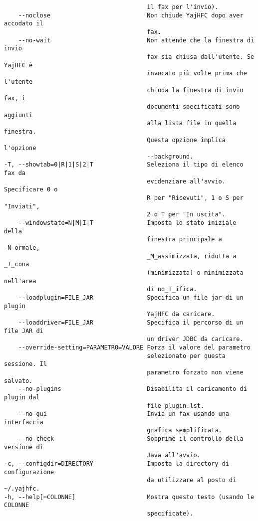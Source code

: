 \documentclass[a4paper,10pt]{scrartcl}
\begin{document}
\begin{verbatim}
                                        il fax per l'invio).
    --noclose                           Non chiude YajHFC dopo aver accodato il
                                        fax.
    --no-wait                           Non attende che la finestra di invio
                                        fax sia chiusa dall'utente. Se YajHFC è
                                        invocato più volte prima che l'utente
                                        chiuda la finestra di invio fax, i
                                        documenti specificati sono aggiunti
                                        alla lista file in quella finestra.
                                        Questa opzione implica l'opzione
                                        --background.
-T, --showtab=0|R|1|S|2|T               Seleziona il tipo di elenco fax da
                                        evidenziare all'avvio. Specificare 0 o
                                        R per "Ricevuti", 1 o S per "Inviati",
                                        2 o T per "In uscita".
    --windowstate=N|M|I|T               Imposta lo stato iniziale della
                                        finestra principale a _N_ormale,
                                        _M_assimizzata, ridotta a _I_cona
                                        (minimizzata) o minimizzata nell'area
                                        di no_T_ifica.
    --loadplugin=FILE_JAR               Specifica un file jar di un plugin
                                        YajHFC da caricare.
    --loaddriver=FILE_JAR               Specifica il percorso di un file JAR di
                                        un driver JDBC da caricare.
    --override-setting=PARAMETRO=VALORE Forza il valore del parametro
                                        selezionato per questa sessione. Il
                                        parametro forzato non viene salvato.
    --no-plugins                        Disabilita il caricamento di plugin dal
                                        file plugin.lst.
    --no-gui                            Invia un fax usando una interfaccia
                                        grafica semplificata.
    --no-check                          Sopprime il controllo della versione di
                                        Java all'avvio.
-c, --configdir=DIRECTORY               Imposta la directory di configurazione
                                        da utilizzare al posto di ~/.yajhfc.
-h, --help[=COLONNE]                    Mostra questo testo (usando le COLONNE
                                        specificate).
\end{verbatim}
\end{document}
